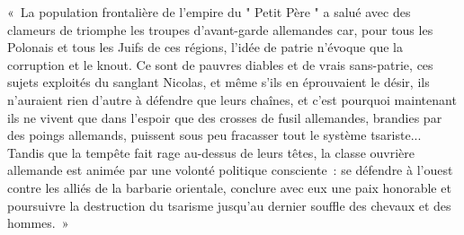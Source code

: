 \documentclass[french,twoside]{book} %
\newenvironment{quoteblock}%
  {\begin{quoting}}
  {\end{quoting}}
\newenvironment{quotebar}{%
    \def\FrameCommand{{\color{rubric!10!}\vrule width 0.5em} \hspace{0.9em}}%
    \def\OuterFrameSep{\itemsep} %
    \MakeFramed {\advance\hsize-\width \FrameRestore}
  }%
  {%
    \endMakeFramed
  }
\renewenvironment{quoteblock}%
  {%
    \savenotes
    \setstretch{0.9}
    \normalfont
    \begin{quotebar}
  }
  {%
    \end{quotebar}
    \spewnotes
  }
\begin{document}
\begin{quoteblock}
 \noindent « La population frontalière de l’empire du " Petit Père " a salué avec des clameurs de triomphe les troupes d’avant-garde allemandes car, pour tous les Polonais et tous les Juifs de ces régions, l’idée de patrie n’évoque que la corruption et le knout. Ce sont de pauvres diables et de vrais sans-patrie, ces sujets exploités du sanglant Nicolas, et même s’ils en éprouvaient le désir, ils n’auraient rien d’autre à défendre que leurs chaînes, et c’est pourquoi maintenant ils ne vivent que dans l’espoir que des crosses de fusil allemandes, brandies par des poings allemands, puissent sous peu fracasser tout le système tsariste... Tandis que la tempête fait rage au-dessus de leurs têtes, la classe ouvrière allemande est animée par une volonté politique consciente : se défendre à l’ouest contre les alliés de la barbarie orientale, conclure avec eux une paix honorable et poursuivre la destruction du tsarisme jusqu’au dernier souffle des chevaux et des hommes. »
\end{quoteblock}
\end{document}
